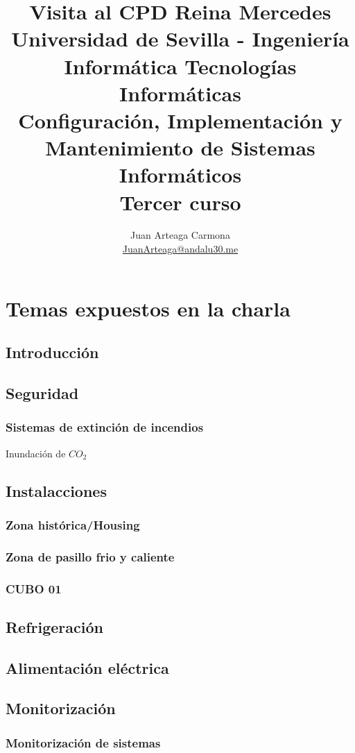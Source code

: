 \documentclass[a4paper,11pt]{article}
\title{
        \textbf{Visita al CPD Reina Mercedes}\large\\
        \medskip
        Universidad de Sevilla - Ingeniería Informática Tecnologías Informáticas\\
        Configuración, Implementación y Mantenimiento de Sistemas Informáticos\\
        Tercer curso}
\author{
Juan Arteaga Carmona\\
\href{mailto:JuanArteaga@andalu30.me}{JuanArteaga@andalu30.me}
}
\begin{document}
\maketitle %
\newpage %
\tableofcontents
\newpage


\section{Temas expuestos en la charla}
\subsection{Introducción}
\subsection{Seguridad}
\subsubsection{Sistemas de extinción de incendios}
Inundación de $CO_2$

\subsection{Instalacciones}
\subsubsection{Zona histórica/Housing}
\subsubsection{Zona de pasillo frio y caliente}
\subsubsection{CUBO 01}

\subsection{Refrigeración}

\subsection{Alimentación eléctrica}

\subsection{Monitorización}
\subsubsection{Monitorización de sistemas}
\end{document}
